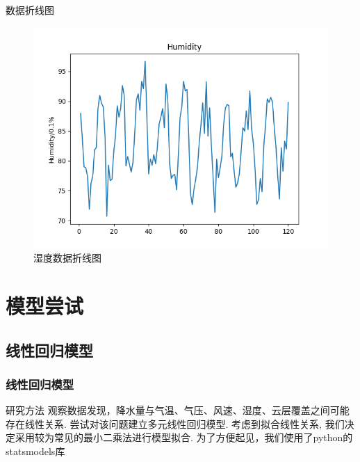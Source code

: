 \documentclass[10pt]{beamer}
\begin{document}
\begin{frame}
\begin{block}{数据折线图}
		\begin{figure}[h!]
			\centering
			\includegraphics[scale=0.21]{../src/prepare_data/hu.png}
			\caption{湿度数据折线图}
		\end{figure}
	\end{block}

\end{frame}

\section{模型尝试}
\subsection{线性回归模型}
\begin{frame}
	\frametitle{线性回归模型}

	\begin{block}{研究方法}
		观察数据发现，降水量与气温、气压、风速、湿度、云层覆盖之间可能存在线性关系.
		尝试对该问题建立多元线性回归模型.
		考虑到拟合线性关系, 我们决定采用较为常见的最小二乘法进行模型拟合.
		为了方便起见，我们使用了python的statsmodels库
	\end{block}
\end{frame}
\end{document}
